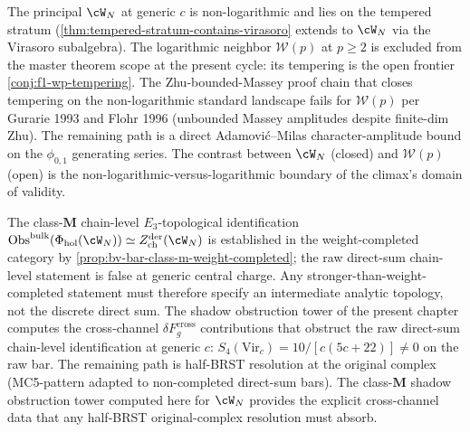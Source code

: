 \begin{remark}
\label{rem:wn-frontier-anchor-f1}
The principal $\cW_N$ at generic $c$ is non-logarithmic and lies
on the tempered stratum
(\cref{thm:tempered-stratum-contains-virasoro} extends to
$\cW_N$ via the Virasoro subalgebra). The logarithmic neighbor
$\mathcal{W}(p)$ at $p \ge 2$ is excluded from the master theorem
scope at the present cycle: its tempering is the open frontier
\cref{conj:f1-wp-tempering}. The Zhu-bounded-Massey proof chain
that closes tempering on the non-logarithmic standard landscape
fails for $\mathcal{W}(p)$ per Gurarie 1993 and Flohr 1996
(unbounded Massey amplitudes despite finite-dim Zhu). The
remaining path is a direct Adamovi\'c--Milas character-amplitude
bound on the $\phi_{0,1}$ generating series. The contrast between
$\cW_N$ (closed) and $\mathcal{W}(p)$ (open) is the
non-logarithmic-versus-logarithmic boundary of the climax's
domain of validity.
\end{remark}

\begin{remark}
\label{rem:wn-frontier-anchor-f3}
The class-$\mathbf{M}$ chain-level $E_{3}$-topological identification
$\mathrm{Obs}^{\mathrm{bulk}}(\Phi_{\mathrm{hol}}(\cW_N))
\simeq Z^{\mathrm{der}}_{\mathrm{ch}}(\cW_N)$ is established in the
weight-completed category by
\ref*{prop:bv-bar-class-m-weight-completed}; the raw direct-sum
chain-level statement is false at generic central charge. Any
stronger-than-weight-completed statement must therefore specify an
intermediate analytic topology, not the discrete direct sum.
The shadow obstruction
tower of the present chapter computes the cross-channel
$\delta F_g^{\mathrm{cross}}$ contributions that obstruct
the raw direct-sum chain-level identification at generic $c$:
$S_4(\mathrm{Vir}_c) = 10/[c(5c + 22)]\neq 0$ on the raw bar.
The remaining path is half-BRST resolution at the
original complex (MC5-pattern adapted to non-completed direct-sum
bars). The class-$\mathbf{M}$ shadow obstruction tower computed
here for $\cW_N$ provides the explicit cross-channel data that
any half-BRST original-complex resolution must absorb.
\end{remark}
